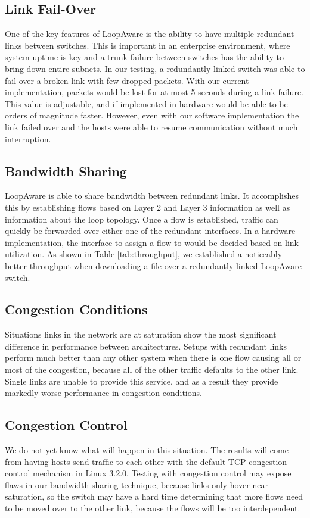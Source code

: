     \subsection{Link Fail-Over}
	One of the key features of LoopAware is the ability to have multiple redundant links between switches.
	This is important in an enterprise environment, where system uptime is key and a trunk failure between switches has the ability to bring down entire subnets.
	In our testing, a redundantly-linked switch was able to fail over a broken link with few dropped packets.
	With our current implementation, packets would be lost for at most 5 seconds during a link failure.
	This value is adjustable, and if implemented in hardware would be able to be orders of magnitude faster.
	However, even with our software implementation the link failed over and the hosts were able to resume communication without much interruption.
	
    \subsection{Bandwidth Sharing}
	LoopAware is able to share bandwidth between redundant links.
	It accomplishes this by establishing flows based on Layer 2 and Layer 3 information as well as information about the loop topology.
	Once a flow is established, traffic can quickly be forwarded over either one of the redundant interfaces.
	In a hardware implementation, the interface to assign a flow to would be decided based on link utilization.
	As shown in Table \ref{tab:throughput}, we established a noticeably better throughput when downloading a file over a redundantly-linked LoopAware switch.
	
    \subsection{Congestion Conditions}
	Situations links in the network are at saturation show the most significant difference in performance between architectures.
	Setups with redundant links perform much better than any other system when there is one flow causing all or most of the congestion, because all of  the other traffic defaults to the other link.
	Single links are unable to provide this service, and as a result they provide markedly worse performance in congestion conditions.

    \subsection{Congestion Control}
	We do not yet know what will happen in this situation.
	The results will come from having hosts send traffic to each other with the default TCP congestion control mechanism in Linux 3.2.0.
	Testing with congestion control may expose flaws in our bandwidth sharing technique, because links only hover near saturation, so the switch may have a hard time determining that more flows need to be moved over to the other link, because the flows will be too interdependent.


